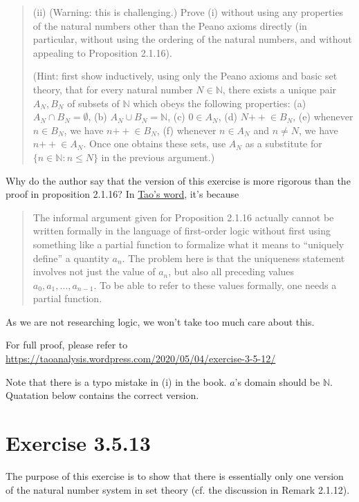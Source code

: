 \documentclass{article}
\newcommand{\doubleplus}{\mathbin{{+}{+}}}
\begin{document}
\begin{quotation}
    (ii) (Warning: this is challenging.)
    Prove (i) without using any properties of the natural numbers other than the Peano axioms directly
    (in particular, without using the ordering of the natural numbers,
    and without appealing to Proposition 2.1.16).

    (Hint: first show inductively, using only the Peano axioms and basic set theory,
    that for every natural number $N \in \mathbb{N}$,
    there exists a unique pair $A_N, B_N$ of subsets of $\mathbb{N}$ which obeys the following properties:
    (a) $A_N \cap B_N = \emptyset$, (b) $A_N \cup B_N = \mathbb{N}$, (c) $0 \in A_N$,
    (d) $N\doubleplus \in B_N$, (e) whenever $n \in B_N$, we have $n\doubleplus \in B_N$,
    (f) whenever $n \in A_N$ and $n \neq N$, we have $n\doubleplus \in A_N$.
    Once one obtains these sets, use $A_N$ as a substitute for
    $\{n \in \mathbb{N} : n \leq N\}$ in the previous argument.)
\end{quotation}

Why do the author say that the version of this exercise is more
rigorous than the proof in proposition 2.1.16?
In \href{https://terrytao.wordpress.com/books/analysis-i/comment-page-15/}{Tao's word}, it's because

\begin{quotation}
    The informal argument given for Proposition 2.1.16 actually cannot be
    written formally in the language of first-order logic without first
    using something like a partial function to formalize what it means to “uniquely define” a quantity $a_n$.
    The problem here is that the uniqueness statement involves not just the value of $a_n$,
    but also all preceding values $a_0, a_1, \dots, a_{n-1}$.
    To be able to refer to these values formally, one needs a partial function.
\end{quotation}

As we are not researching logic, we won't take too much care about this.

For full proof, please refer to \url{https://taoanalysis.wordpress.com/2020/05/04/exercise-3-5-12/}

Note that there is a typo mistake in (i) in the book. $a$'s domain should be $\mathbb{N}$.
Quatation below contains the correct version.

\section{Exercise 3.5.13}
The purpose of this exercise is to show that there is essentially only one version
of the natural number system in set theory (cf. the discussion in Remark 2.1.12).
\end{document}
